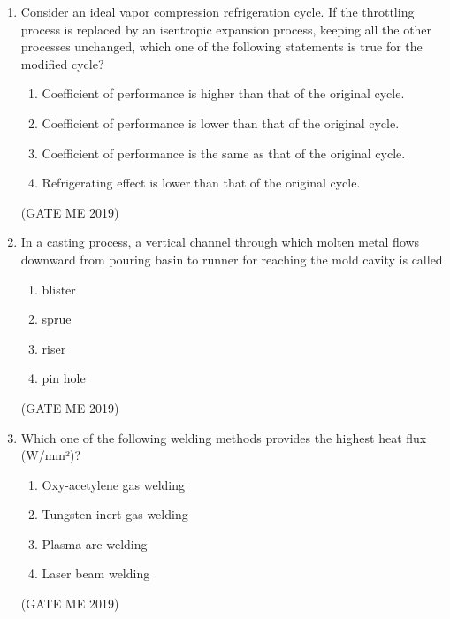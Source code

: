 \documentclass[journal]{IEEEtran}
\begin{document}
\begin{enumerate}
\item Consider an ideal vapor compression refrigeration cycle. If the throttling process is replaced by an isentropic expansion process, keeping all the other processes unchanged, which one of the following statements is true for the modified cycle?
\begin{enumerate}
    \item Coefficient of performance is higher than that of the original cycle.
    \item Coefficient of performance is lower than that of the original cycle.
    \item Coefficient of performance is the same as that of the original cycle.
    \item Refrigerating effect is lower than that of the original cycle.
\end{enumerate}
\hfill (GATE ME 2019)

\item In a casting process, a vertical channel through which molten metal flows downward from pouring basin to runner for reaching the mold cavity is called
\begin{multicols}{4}
\begin{enumerate}
    \item blister
    \item sprue
    \item riser
    \item pin hole
\end{enumerate}
\end{multicols}
\hfill (GATE ME 2019)

\item Which one of the following welding methods provides the highest heat flux (W/mm²)?
\begin{multicols}{2}
\begin{enumerate}
    \item Oxy-acetylene gas welding
    \item Tungsten inert gas welding
    \item Plasma arc welding
    \item Laser beam welding
\end{enumerate}
\end{multicols}
\hfill (GATE ME 2019)


\end{enumerate}
\end{document}
